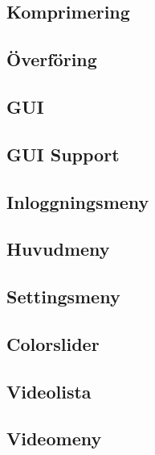 \subsection{Komprimering}


\subsection{Överföring}


\subsection{GUI}


\subsection{GUI Support}


\subsection{Inloggningsmeny}


\subsection{Huvudmeny}


\subsection{Settingsmeny}


\subsection{Colorslider}


\subsection{Videolista}


\subsection{Videomeny}

